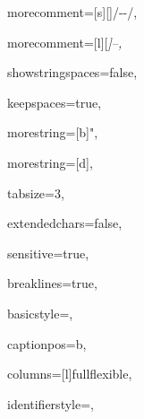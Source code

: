 {%

morecomment=[s][\color{commentcolor}]{/-}{-/},

morecomment=[l][\itshape \color{commentcolor}]{--},




showstringspaces=false,




keepspaces=true,




morestring=[b]",

morestring=[d],




tabsize=3,




extendedchars=false,




sensitive=true,




breaklines=true,




basicstyle=\ttfamily,




captionpos=b,




columns=[l]fullflexible,






identifierstyle={\ttfamily\color{black}},






}
